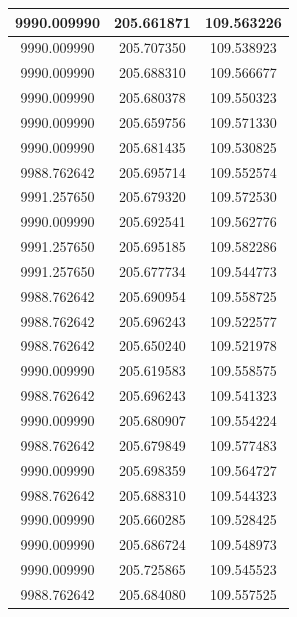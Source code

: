 \documentclass[a4paper,14pt]{article}
\begin{document}
\begin{longtable}[c]{|c|c|c|}
	9990.009990       & 205.661871           & 109.563226        \\ \hline
	9990.009990       & 205.707350           & 109.538923        \\ \hline
	9990.009990       & 205.688310           & 109.566677        \\ \hline
	9990.009990       & 205.680378           & 109.550323        \\ \hline
	9990.009990       & 205.659756           & 109.571330        \\ \hline
	9990.009990       & 205.681435           & 109.530825        \\ \hline
	9988.762642       & 205.695714           & 109.552574        \\ \hline
	9991.257650       & 205.679320           & 109.572530        \\ \hline
	9990.009990       & 205.692541           & 109.562776        \\ \hline
	9991.257650       & 205.695185           & 109.582286        \\ \hline
	9991.257650       & 205.677734           & 109.544773        \\ \hline
	9988.762642       & 205.690954           & 109.558725        \\ \hline
	9988.762642       & 205.696243           & 109.522577        \\ \hline
	9988.762642       & 205.650240           & 109.521978        \\ \hline
	9990.009990       & 205.619583           & 109.558575        \\ \hline
	9988.762642       & 205.696243           & 109.541323        \\ \hline
	9990.009990       & 205.680907           & 109.554224        \\ \hline
	9988.762642       & 205.679849           & 109.577483        \\ \hline
	9990.009990       & 205.698359           & 109.564727        \\ \hline
	9988.762642       & 205.688310           & 109.544323        \\ \hline
	9990.009990       & 205.660285           & 109.528425        \\ \hline
	9990.009990       & 205.686724           & 109.548973        \\ \hline
	9990.009990       & 205.725865           & 109.545523        \\ \hline
	9988.762642       & 205.684080           & 109.557525        \\ \hline

\end{longtable}
\end{document}

